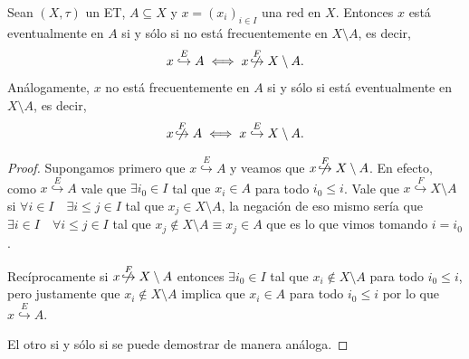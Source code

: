 \documentclass{article}
\theoremstyle{plain}
\theoremstyle{definition}
\newcommand{\evto}[1]{\stackrel{E}{\hookrightarrow} #1}   %
\newcommand{\frto}[1]{\stackrel{F}{\hookrightarrow} #1}   %
\newcommand{\nnfrto}[1]{\not\!\stackrel{F}{\hookrightarrow} #1}
\newenvironment{ejercicio}[1]{\begin{trivlist}
\item[\hskip \labelsep {\bfseries Ejercicio}\hskip \labelsep {\bfseries #1.}]}{\end{trivlist}}
\begin{document}
\begin{ejercicio}{4}
    Sean \( (X, \tau) \) un ET, \( A \subseteq X \) y \( x = {(x_i)}_{i \in I} \) una red en \( X \). Entonces \( x \) está eventualmente en \( A \) si y sólo si no está frecuentemente en \( X \setminus A \), es decir,
    \[
        x \evto{A} \iff x \nnfrto{X \setminus A}.
    \]
    Análogamente, \( x \) no está frecuentemente en \( A \) si y sólo si está eventualmente en \( X \setminus A \), es decir,
    \[
        x \nnfrto{A} \iff x \evto{X \setminus A}.
    \]
\end{ejercicio}
\begin{proof}
    Supongamos primero que \( x \evto{A} \) y veamos que \( x \nnfrto{X \setminus A} \). En efecto, como \( x \evto{A} \) vale que \( \exists i_0 \in I \) tal que \( x_i \in A \) para todo \( i_0 \leq i \). Vale que
    \( x \frto{X \setminus A} \) si \( \forall i \in I \quad \exists i \leq j \in I \) tal que \( x_j \in X \setminus A \),
    la negación de eso mismo sería que \( \exists i \in I \quad \forall i \leq j \in I \) tal que \( x_j \notin X \setminus A \equiv x_j \in A \) que es lo que vimos tomando \( i = i_0 \).

    Recíprocamente si \( x \nnfrto{X \setminus A} \) entonces \( \exists i_0 \in I \) tal que \( x_i \notin X \setminus A \) para todo \( i_0 \leq i \),
    pero justamente que \( x_i \notin X \setminus A \) implica que \( x_i \in A \) para todo
    \( i_0 \leq i \) por lo que \( x \evto{A} \).

    El otro si y sólo si se puede demostrar de manera análoga.
\end{proof}
\end{document}
